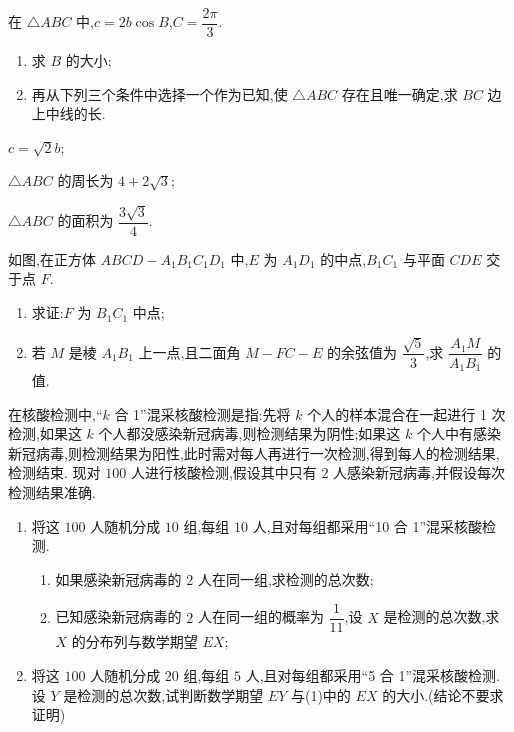 \begin{problem}
在 \(\triangle ABC\) 中,\(c=2b\cos B\),\(C=\dfrac{2\pi}{3}\).

\begin{enumerate}
    \item 求 \(B\) 的大小;
    \item 再从下列三个条件中选择一个作为已知,使 \(\triangle ABC\) 存在且唯一确定,求 \(BC\) 边上中线的长.
\end{enumerate}

\begin{circlelist}
\item \(c=\sqrt2b\);

\item \(\triangle ABC\) 的周长为 \(4+2\sqrt3\);

\item \(\triangle ABC\) 的面积为 \(\dfrac{3\sqrt3}{4}\).
\end{circlelist}
\end{problem}

\begin{problem}
如图,在正方体 \(ABCD-A_1B_1C_1D_1\) 中,\(E\) 为 \(A_1D_1\) 的中点,\(B_1C_1\) 与平面 \(CDE\) 交于点 \(F\).

\begin{enumerate}
    \item 求证:\(F\) 为 \(B_1C_1\) 中点;
    \item 若 \(M\) 是棱 \(A_1B_1\) 上一点,且二面角 \(M-FC-E\) 的余弦值为 \(\dfrac{\sqrt5}{3}\),求 \(\dfrac{A_1M}{A_1B_1}\) 的值.
\end{enumerate}

\end{problem}

\begin{problem}
在核酸检测中,``\(k\) 合 1''混采核酸检测是指:先将 \(k\) 个人的样本混合在一起进行 1 次检测,如果这 \(k\) 个人都没感染新冠病毒,则检测结果为阴性;如果这 \(k\) 个人中有感染新冠病毒,则检测结果为阳性,此时需对每人再进行一次检测,得到每人的检测结果,检测结束. 现对 \(100\) 人进行核酸检测,假设其中只有 \(2\) 人感染新冠病毒,并假设每次检测结果准确.

\begin{enumerate}
    \item 将这 \(100\) 人随机分成 \(10\) 组,每组 \(10\) 人,且对每组都采用``10 合 1''混采核酸检测.
    \begin{enumerate}
        \item 如果感染新冠病毒的 \(2\) 人在同一组,求检测的总次数;
        \item 已知感染新冠病毒的 \(2\) 人在同一组的概率为 \(\dfrac{1}{11}\),设 \(X\) 是检测的总次数,求 \(X\) 的分布列与数学期望 \(EX\);
    \end{enumerate}
    \item 将这 \(100\) 人随机分成 \(20\) 组,每组 \(5\) 人,且对每组都采用``5 合 1''混采核酸检测. 设 \(Y\) 是检测的总次数,试判断数学期望 \(EY\) 与(1)中的 \(EX\) 的大小.(结论不要求证明)
\end{enumerate}
\end{problem}

